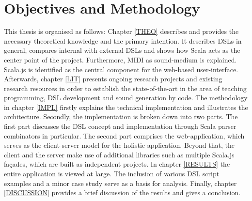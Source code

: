 \section{Objectives and Methodology}
\label{INTRO_METHOD}
This thesis is organised as follows: Chapter \ref{THEO} describes and provides the necessary theoretical knowledge and the primary intention. It describes DSLs in general, compares internal with external DSLs and shows how Scala acts as the center point of the project. Furthermore, MIDI as sound-medium is explained. Scala.js is identified as the central component for the web-based user-interface. Afterwards, chapter \ref{LIT} presents ongoing research projects and existing research resources in order to establish the state-of-the-art in the area of teaching programming, DSL development and sound generation by code. The methodology in chapter \ref{IMPL} firstly explains the technical implementation and illustrates the architecture. Secondly, the implementation is broken down into two parts. The first part discusses the DSL concept and implementation through Scala parser combinators in particular. The second part comprises the web-application, which serves as the client-server model for the holistic application. Beyond that, the client and the server make use of additional libraries such as multiple Scala.js façades, which are built as independent projects. In chapter \ref{RESULTS} the entire application is viewed at large. The inclusion of various DSL script examples and a minor case study serve as a basis for analysis. Finally, chapter \ref{DISCUSSION} provides a brief discussion of the results and gives a conclusion.



